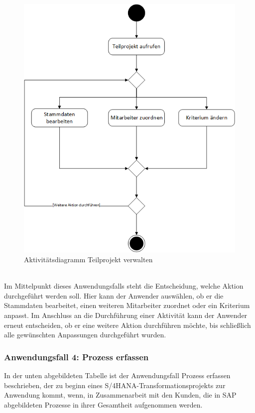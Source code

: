 \begin{figure}[h!]
    \centering
    \includegraphics[scale=0.67]{./Bilder/AD3_TeilprojektVerwalten.png}
    \caption[Aktivitätsdiagramm Anwendungsfall 3]{Aktivitätsdiagramm Teilprojekt verwalten}
    \label{fig:AD3}
\end{figure}
\\Im Mittelpunkt dieses Anwendungsfalls steht die Entscheidung, welche Aktion durchgeführt werden soll. Hier kann der Anwender auswählen, ob er die Stammdaten bearbeitet, einen weiteren Mitarbeiter zuordnet oder ein Kriterium anpasst. Im Anschluss an die Durchführung einer Aktivität kann der Anwender erneut entscheiden, ob er eine weitere Aktion durchführen möchte, bis schließlich alle gewünschten Anpassungen durchgeführt wurden.

\newpage
\subsubsection{Anwendungsfall 4: Prozess erfassen}
In der unten abgebildeten Tabelle ist der Anwendungsfall \glqq{}Prozess erfassen\grqq{} beschrieben, der zu beginn eines S/4HANA-Transformationsprojekts zur Anwendung kommt, wenn, in Zusammenarbeit mit den Kunden, die in SAP abgebildeten Prozesse in ihrer Gesamtheit aufgenommen werden.\\

